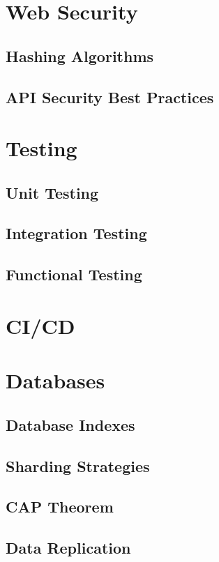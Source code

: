 \documentclass[a4paper]{article}
\begin{document}
    \newpage
    \section{Web Security}
    \subsection{Hashing Algorithms}
    \subsection{API Security Best Practices}

    \newpage
    \section{Testing}
    \subsection{Unit Testing}
    \subsection{Integration Testing}
    \subsection{Functional Testing}
    
    \newpage
    \section{CI/CD}
    
    \newpage
    \section{Databases}
    \subsection{Database Indexes}
    \subsection{Sharding Strategies}
    \subsection{CAP Theorem}
    \subsection{Data Replication}
\end{document}
